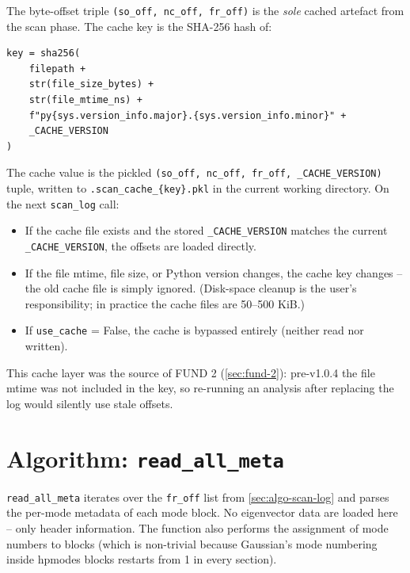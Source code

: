 \documentclass[10pt,a4paper,twoside]{article}
\newcommand{\codref}[1]{%
  \quad\text{\textcolor{gray!70!black}{\footnotesize $\rightsquigarrow$~\texttt{#1}}}}
\newcommand{\fn}[1]{\texttt{#1}}
\newcommand{\file}[1]{\texttt{#1}}
\newcommand{\cfgkey}[1]{\texttt{#1}}
\begin{document}
The byte-offset triple \texttt{(so\_off, nc\_off, fr\_off)} is the
\emph{sole} cached artefact from the scan phase. The cache key is
the SHA-256 hash of:

\begin{lstlisting}[style=pseudo]
key = sha256(
    filepath +
    str(file_size_bytes) +
    str(file_mtime_ns) +
    f"py{sys.version_info.major}.{sys.version_info.minor}" +
    _CACHE_VERSION
)
\end{lstlisting}

The cache value is the pickled \texttt{(so\_off, nc\_off, fr\_off,
\_CACHE\_VERSION)} tuple, written to
\file{.scan\_cache\_\{key\}.pkl} in the current working directory.
On the next \fn{scan\_log} call:

\begin{itemize}
  \item If the cache file exists and the stored
        \texttt{\_CACHE\_VERSION} matches the current
        \texttt{\_CACHE\_VERSION}, the offsets are loaded directly.
  \item If the file mtime, file size, or Python version changes,
        the cache key changes -- the old cache file is simply
        ignored. (Disk-space cleanup is the user's responsibility;
        in practice the cache files are 50--500 KiB.)
  \item If \cfgkey{use\_cache} = False, the cache is bypassed
        entirely (neither read nor written).
\end{itemize}

This cache layer was the source of FUND 2
(\cref{sec:fund-2}): pre-v1.0.4 the file mtime was not included
in the key, so re-running an analysis after replacing the log
would silently use stale offsets.

\section{Algorithm: \fn{read\_all\_meta}}
\label{sec:algo-read-meta}

\codref{logio.read\_all\_meta}

\fn{read\_all\_meta} iterates over the \fn{fr\_off} list from
\cref{sec:algo-scan-log} and parses the per-mode metadata of each
mode block. No eigenvector data are loaded here -- only header
information. The function also performs the assignment of mode
numbers to blocks (which is non-trivial because Gaussian's mode
numbering inside hpmodes blocks restarts from 1 in every section).
\end{document}
